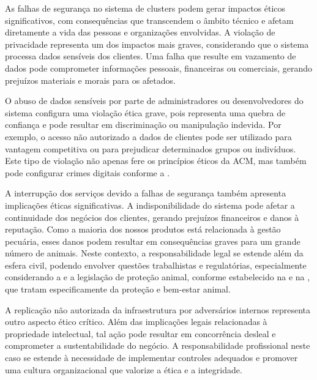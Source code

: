 As falhas de segurança no sistema de clusters podem gerar impactos éticos significativos, com consequências que transcendem o âmbito técnico e afetam diretamente a vida das pessoas e organizações envolvidas. A violação de privacidade representa um dos impactos mais graves, considerando que o sistema processa dados sensíveis dos clientes. Uma falha que resulte em vazamento de dados pode comprometer informações pessoais, financeiras ou comerciais, gerando prejuízos materiais e morais para os afetados.

O abuso de dados sensíveis por parte de administradores ou desenvolvedores do sistema configura uma violação ética grave, pois representa uma quebra de confiança e pode resultar em discriminação ou manipulação indevida. Por exemplo, o acesso não autorizado a dados de clientes pode ser utilizado para vantagem competitiva ou para prejudicar determinados grupos ou indivíduos. Este tipo de violação não apenas fere os princípios éticos da ACM, mas também pode configurar crimes digitais conforme a \cite{lei12737}.

A interrupção dos serviços devido a falhas de segurança também apresenta implicações éticas significativas. A indisponibilidade do sistema pode afetar a continuidade dos negócios dos clientes, gerando prejuízos financeiros e danos à reputação. Como a maioria dos nossos produtos está relacionada à gestão pecuária, esses danos podem resultar em consequências graves para um grande número de animais. Neste contexto, a responsabilidade legal se estende além da esfera civil, podendo envolver questões trabalhistas e regulatórias, especialmente considerando a \cite{lgpd} e a legislação de proteção animal, conforme estabelecido na \cite{lei9605} e na \cite{lei14064}, que tratam especificamente da proteção e bem-estar animal.

A replicação não autorizada da infraestrutura por adversários internos representa outro aspecto ético crítico. Além das implicações legais relacionadas à propriedade intelectual, tal ação pode resultar em concorrência desleal e comprometer a sustentabilidade do negócio. A responsabilidade profissional neste caso se estende à necessidade de implementar controles adequados e promover uma cultura organizacional que valorize a ética e a integridade.